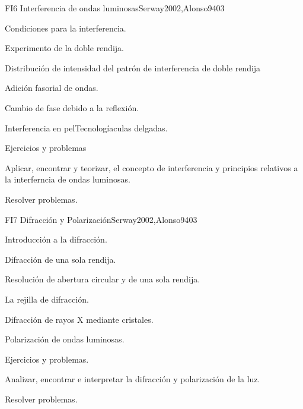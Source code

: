 \begin{syllabus}
\begin{unit}{FI6 Interferencia de ondas luminosas}{}{Serway2002,Alonso94}{0}{3}
\begin{topics}
      \item Condiciones para la interferencia.
        \item Experimento de la doble rendija.
        \item Distribución de intensidad del patrón
              de interferencia de doble rendija
        \item Adición fasorial de ondas.
        \item Cambio de fase debido a la reflexión.
        \item Interferencia en pelTecnologíaculas delgadas.
        \item Ejercicios y problemas
   \end{topics}
   \begin{learningoutcomes}
      \item Aplicar, encontrar y teorizar, el concepto de interferencia y
            principios relativos a la interferncia de ondas luminosas.
      \item Resolver problemas.
   \end{learningoutcomes}
\end{unit}

\begin{unit}{FI7 Difracción y Polarización}{}{Serway2002,Alonso94}{0}{3}
\begin{topics}
      \item Introducción a la difracción.
      \item Difracción de una sola rendija.
      \item Resolución de abertura circular y de una sola rendija.
      \item La rejilla de difracción.
      \item Difracción de rayos X mediante cristales.
      \item Polarización de ondas luminosas.
      \item Ejercicios y problemas.
   \end{topics}

   \begin{learningoutcomes}
      \item Analizar, encontrar e interpretar la difracción y polarización de la luz.
      \item Resolver problemas.
   \end{learningoutcomes}
\end{unit}

\begin{coursebibliography}
\end{coursebibliography}

\end{syllabus}
